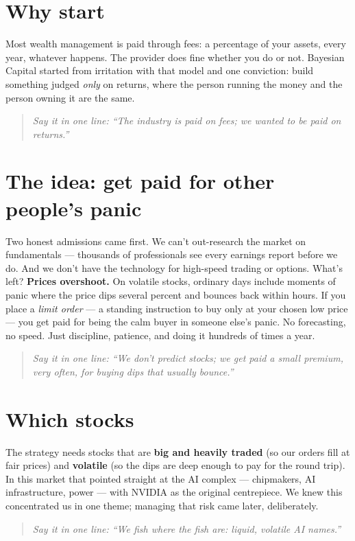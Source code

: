 \documentclass[11pt,a4paper]{article}
\newcommand{\oneline}[1]{\begin{quote}\itshape\color{bcteal}Say it in one line:
``#1''\end{quote}}
\begin{document}
\section{Why start}

Most wealth management is paid through fees: a percentage of your assets,
every year, whatever happens. The provider does fine whether you do or not.
Bayesian Capital started from irritation with that model and one conviction:
build something judged \emph{only} on returns, where the person running the
money and the person owning it are the same.

\oneline{The industry is paid on fees; we wanted to be paid on returns.}

\section{The idea: get paid for other people's panic}

Two honest admissions came first. We can't out-research the market on
fundamentals --- thousands of professionals see every earnings report before
we do. And we don't have the technology for high-speed trading or options.
What's left? \textbf{Prices overshoot.} On volatile stocks, ordinary days
include moments of panic where the price dips several percent and bounces
back within hours. If you place a \emph{limit order} --- a standing instruction
to buy only at your chosen low price --- you get paid for being the calm buyer
in someone else's panic. No forecasting, no speed. Just discipline, patience,
and doing it hundreds of times a year.

\oneline{We don't predict stocks; we get paid a small premium, very often,
for buying dips that usually bounce.}

\section{Which stocks}

The strategy needs stocks that are \textbf{big and heavily traded} (so our
orders fill at fair prices) and \textbf{volatile} (so the dips are deep enough
to pay for the round trip). In this market that pointed straight at the AI
complex --- chipmakers, AI infrastructure, power --- with NVIDIA as the
original centrepiece. We knew this concentrated us in one theme; managing
that risk came later, deliberately.

\oneline{We fish where the fish are: liquid, volatile AI names.}
\end{document}
